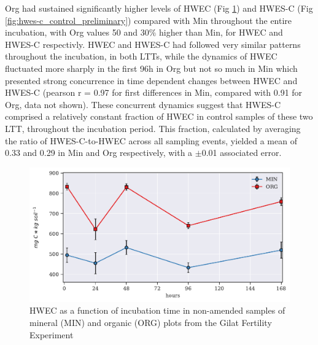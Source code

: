             Org had sustained significantly higher levels of HWEC (Fig \ref{fig:hwec_control_preliminary}) and HWES-C (Fig \ref{fig:hwes-c_control_preliminary}) compared with Min throughout the entire incubation, with Org values 50 and 30$\%$ higher than Min, for HWEC and HWES-C respectivly. HWEC and HWES-C had followed very similar patterns throughout the incubation, in both LTTs, while the dynamics of HWEC fluctuated more sharply in the first 96h in Org but not so much in Min which presented strong concurrence in time dependent changes between HWEC and HWES-C (pearson r = 0.97 for first differences in Min, compared with 0.91 for Org, data not shown). These concurrent dynamics suggest that HWES-C comprised a relatively constant fraction of HWEC in control samples of these two LTT, throughout the incubation period. This fraction, calculated by averaging the ratio of HWES-C-to-HWEC across all sampling events, yielded a mean of 0.33 and 0.29 in Min and Org respectively, with a $\pm$0.01 associated error.

            \begin{figure}[H]
                \centering
                \includegraphics[scale=0.8]{thesis_figures/preliminary/control/HWEC.pdf}
                \caption{HWEC as a function of incubation time in non-amended samples  of mineral (MIN) and organic (ORG) plots from the Gilat Fertility Experiment}
                \label{fig:hwec_control_preliminary}
            \end{figure}

